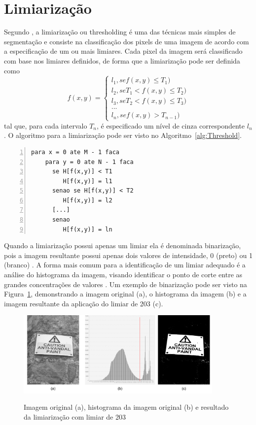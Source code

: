 \documentclass[12pt,oneside,a4paper,english,french,spanish,brazil,]{abntex2}
\begin{document}
\section{Limiarização}

Segundo \citet{pedrini:2008}, a limiarização ou thresholding é uma das técnicas mais simples de segmentação e consiste na classificação dos pixels de uma imagem de acordo com a especificação de um ou mais limiares. Cada pixel da imagem será classificado com base nos limiares definidos, de forma que a limiarização pode ser definida como \[f(x,y)=\left\{\begin{matrix} l_1, se f(x,y) \leq T_1) \\ l_2, se T_1 < f(x,y) \leq T_2)\\ l_3, se T_2 < f(x,y) \leq T_3)\\ ...\\ l_n, se f(x,y) > T_{n-1}) \end{matrix}\right.\] tal que, para cada intervalo \(T_n\), é especificado um nível de cinza correspondente \(l_n\). O algoritmo para a limiarização pode ser visto no Algoritmo~\ref{alg:Threshold}.

\begin{lstlisting}[caption={Algoritmo para limiatrização}, label=alg:Threshold, numbers=left]
para x = 0 ate M - 1 faca
    para y = 0 ate N - 1 faca
      se H[f(x,y)] < T1
         H[f(x,y)] = l1
      senao se H[f(x,y)] < T2
         H[f(x,y)] = l2
      [...]
      senao 
         H[f(x,y)] = ln
\end{lstlisting}

Quando a limiarização possui apenas um limiar ela é denominada binarização, pois a imagem resultante possui apenas dois valores de intensidade, 0 (preto) ou 1 (branco) \cite{pedrini:2008}. A forma mais comum para a identificação de um limiar adequado é a análise do histograma da imagem, visando identificar o ponto de corte entre as grandes concentrações de valores \cite{gonzalez:2012}. Um exemplo de binarização pode ser visto na Figura~\ref{fig:PDI_Limiarizacao}, demonstrando a imagem original (a), o histograma da imagem (b) e a imagem resultante da aplicação do limiar de  203 (c).

\begin{figure}[ht]
\centering
\caption{ Imagem original (a), histograma da imagem original (b) e resultado da limiarização com limiar de 203}
\includegraphics[width=0.9\textwidth]{imagens/PDI_Limiarizacao.pdf}
\sourceAuthor
\label{fig:PDI_Limiarizacao}
\end{figure}
\end{document}
